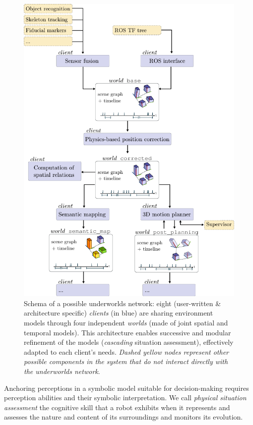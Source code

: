 \documentclass[letterpaper, 10 pt, conference]{ieeeconf}  %
\newcommand{\uwds}{{\sc underworlds}\xspace}
\begin{document}
\begin{figure}[ht!]
    \centering
    \includegraphics[width=\linewidth]{overview}
    \caption{Schema of a possible \uwds network: eight (user-written \&
    architecture specific) \emph{clients} (in blue) are sharing environment
    models through four independent \emph{worlds} (made of joint spatial and
    temporal models). This architecture enables successive and modular
    refinement of the models (\emph{cascading} situation assessment),
    effectively adapted to each client's needs. \textit{Dashed yellow nodes represent
    other possible components in the system that do not interact directly with
    the \uwds network}.}

    \label{fig|scene}

\end{figure}


Anchoring perceptions in a symbolic model suitable for decision-making requires
perception abilities and their symbolic interpretation. We call \emph{physical
situation assessment} the cognitive skill that a robot exhibits when it
represents and assesses the nature and content of its surroundings and monitors
its evolution.
\end{document}
